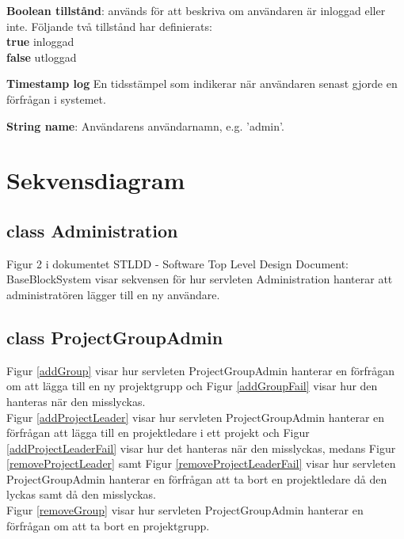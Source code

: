 \documentclass[a4paper]{article}
\begin{document}
\vspace{5mm}
\begin{hangparas}{1.5em}{1}
\textbf{Boolean tillstånd}: används för att beskriva om användaren är inloggad eller inte. Följande två tillstånd har definierats:\\
\textbf{true} inloggad\\
\textbf{false} utloggad
\end{hangparas}

\vspace{5mm}
\begin{hangparas}{1.5em}{1}
\textbf{Timestamp log} En tidsstämpel som indikerar när användaren senast gjorde en förfrågan i systemet.
\end{hangparas}

\vspace{5mm}
\begin{hangparas}{1.5em}{1}
\textbf{String name}: Användarens användarnamn, e.g. 'admin'. 
\end{hangparas}




\section{Sekvensdiagram}
\subsection{class Administration}
Figur 2 i dokumentet STLDD - Software Top Level Design Document: BaseBlockSystem visar sekvensen för hur servleten Administration hanterar att administratören lägger till en ny användare.


\subsection{class ProjectGroupAdmin}
Figur \ref{addGroup} visar hur servleten ProjectGroupAdmin hanterar en förfrågan om att lägga till en ny projektgrupp och Figur \ref{addGroupFail} visar hur den hanteras när den misslyckas.\\
Figur \ref{addProjectLeader} visar hur servleten ProjectGroupAdmin hanterar en förfrågan att lägga till en projektledare i ett projekt och Figur \ref{addProjectLeaderFail} visar hur det hanteras när den misslyckas, medans Figur \ref{removeProjectLeader} samt Figur \ref{removeProjectLeaderFail} visar hur servleten ProjectGroupAdmin hanterar en förfrågan att ta bort en projektledare då den lyckas samt då den misslyckas.\\
Figur \ref{removeGroup} visar hur servleten ProjectGroupAdmin hanterar en förfrågan om att ta bort en projektgrupp.
\end{document}
